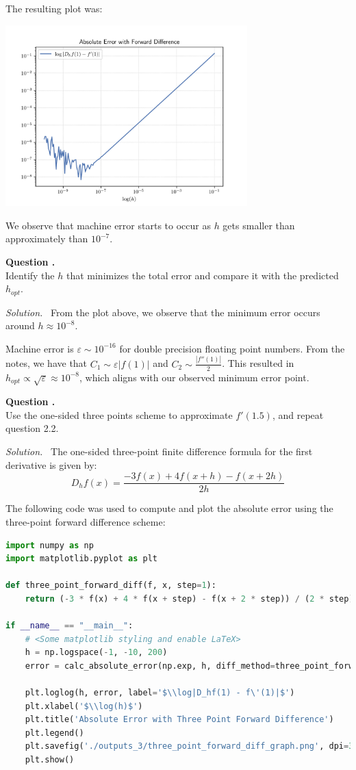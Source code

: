 \documentclass[12pt]{article}
\newcounter{question}
\newcounter{subquest}
\newcommand{\subquestion}{
    \stepcounter{subquest} 
    \vspace{.5em}
    \textbf{\large Question \thequestion.\thesubquest}
    \vspace{.25em}\ \\}
\newcommand{\solution}
    {\par\vspace{0.5em}\noindent\emph{Solution.}\ }
    {\par\vspace{1em}}
\begin{document}
The resulting plot was:
\begin{center}
\includegraphics[width=0.7\textwidth]{../outputs_3/forward_diff_graph.png}
\end{center}

We observe that machine error starts to occur as $h$ gets smaller than approximately than $10^{-7}$.

\subquestion
Identify the $h$ that minimizes the total error and 
compare it with the predicted $h_{opt}$.

\solution
From the plot above, we observe that the minimum error occurs around $h \approx 10^{-8}$.

Machine error is $\varepsilon \sim 10^{-16}$ for double precision floating point numbers. From the notes, we have that $C_1 \sim \varepsilon |f(1)|$ and $C_2 \sim \frac{|f''(1)|}{2}$. This resulted in $h_{opt} \propto \sqrt{\varepsilon} \approx 10^{-8}$, which aligns with our observed minimum error point.

\subquestion
Use the one-sided three points scheme to approximate $f'(1.5)$, and repeat question 2.2.

\solution
The one-sided three-point finite difference formula for the first derivative is given by:
\[D_hf(x) = \frac{-3f(x) +4f(x+h) - f(x+2h)}{2h}\]

The following code was used to compute and plot the absolute error using the three-point forward difference scheme:
\begin{lstlisting}[language=Python, caption=2.4 Python]
import numpy as np 
import matplotlib.pyplot as plt

def three_point_forward_diff(f, x, step=1):
    return (-3 * f(x) + 4 * f(x + step) - f(x + 2 * step)) / (2 * step)

if __name__ == "__main__":
    # <Some matplotlib styling and enable LaTeX>
    h = np.logspace(-1, -10, 200)
    error = calc_absolute_error(np.exp, h, diff_method=three_point_forward_diff)
    
    plt.loglog(h, error, label='$\\log|D_hf(1) - f\'(1)|$')
    plt.xlabel('$\\log(h)$')
    plt.title('Absolute Error with Three Point Forward Difference')
    plt.legend()
    plt.savefig('./outputs_3/three_point_forward_diff_graph.png', dpi=300)
    plt.show()
\end{lstlisting}
\end{document}
